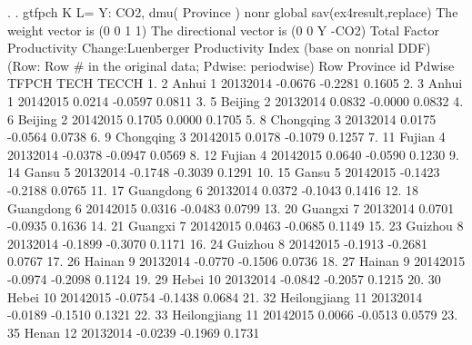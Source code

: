 . 
. gtfpch K L= Y: CO2, dmu( Province ) nonr  global sav(ex4result,replace)
{\smallskip}
The weight vector is (0 0 1 1)
{\smallskip}
The directional vector is (0 0 Y -CO2)
{\smallskip}
{\smallskip}
Total Factor Productivity Change:Luenberger Productivity Index (base on nonrial DDF)
(Row: Row \# in the original data; Pdwise: periodwise)
{\smallskip}
{\TLC}
{\VBAR} Row         Province   id      Pdwise     TFPCH      TECH    TECCH {\VBAR}
{\LFTT}
1. {\VBAR}   2            Anhui    1   2013{\tytilde}2014   -0.0676   -0.2281   0.1605 {\VBAR}
2. {\VBAR}   3            Anhui    1   2014{\tytilde}2015    0.0214   -0.0597   0.0811 {\VBAR}
3. {\VBAR}   5          Beijing    2   2013{\tytilde}2014    0.0832   -0.0000   0.0832 {\VBAR}
4. {\VBAR}   6          Beijing    2   2014{\tytilde}2015    0.1705    0.0000   0.1705 {\VBAR}
5. {\VBAR}   8        Chongqing    3   2013{\tytilde}2014    0.0175   -0.0564   0.0738 {\VBAR}
6. {\VBAR}   9        Chongqing    3   2014{\tytilde}2015    0.0178   -0.1079   0.1257 {\VBAR}
7. {\VBAR}  11           Fujian    4   2013{\tytilde}2014   -0.0378   -0.0947   0.0569 {\VBAR}
8. {\VBAR}  12           Fujian    4   2014{\tytilde}2015    0.0640   -0.0590   0.1230 {\VBAR}
9. {\VBAR}  14            Gansu    5   2013{\tytilde}2014   -0.1748   -0.3039   0.1291 {\VBAR}
10. {\VBAR}  15            Gansu    5   2014{\tytilde}2015   -0.1423   -0.2188   0.0765 {\VBAR}
11. {\VBAR}  17        Guangdong    6   2013{\tytilde}2014    0.0372   -0.1043   0.1416 {\VBAR}
12. {\VBAR}  18        Guangdong    6   2014{\tytilde}2015    0.0316   -0.0483   0.0799 {\VBAR}
13. {\VBAR}  20          Guangxi    7   2013{\tytilde}2014    0.0701   -0.0935   0.1636 {\VBAR}
14. {\VBAR}  21          Guangxi    7   2014{\tytilde}2015    0.0463   -0.0685   0.1149 {\VBAR}
15. {\VBAR}  23          Guizhou    8   2013{\tytilde}2014   -0.1899   -0.3070   0.1171 {\VBAR}
16. {\VBAR}  24          Guizhou    8   2014{\tytilde}2015   -0.1913   -0.2681   0.0767 {\VBAR}
17. {\VBAR}  26           Hainan    9   2013{\tytilde}2014   -0.0770   -0.1506   0.0736 {\VBAR}
18. {\VBAR}  27           Hainan    9   2014{\tytilde}2015   -0.0974   -0.2098   0.1124 {\VBAR}
19. {\VBAR}  29            Hebei   10   2013{\tytilde}2014   -0.0842   -0.2057   0.1215 {\VBAR}
20. {\VBAR}  30            Hebei   10   2014{\tytilde}2015   -0.0754   -0.1438   0.0684 {\VBAR}
21. {\VBAR}  32     Heilongjiang   11   2013{\tytilde}2014   -0.0189   -0.1510   0.1321 {\VBAR}
22. {\VBAR}  33     Heilongjiang   11   2014{\tytilde}2015    0.0066   -0.0513   0.0579 {\VBAR}
23. {\VBAR}  35            Henan   12   2013{\tytilde}2014   -0.0239   -0.1969   0.1731 {\VBAR}
